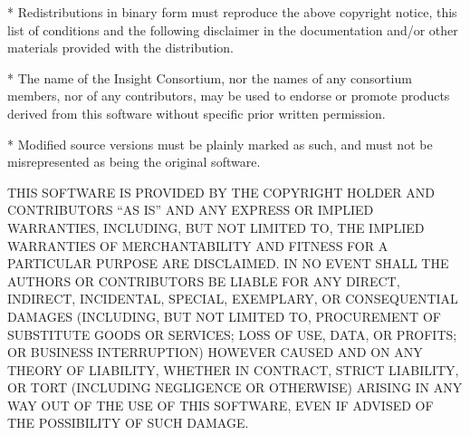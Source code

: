 \documentclass{InsightHowto}
\begin{document}
 * Redistributions in binary form must reproduce the above copyright notice,
   this list of conditions and the following disclaimer in the documentation
   and/or other materials provided with the distribution.

 * The name of the Insight Consortium, nor the names of any consortium members,
   nor of any contributors, may be used to endorse or promote products derived
   from this software without specific prior written permission.

  * Modified source versions must be plainly marked as such, and must not be
    misrepresented as being the original software.

THIS SOFTWARE IS PROVIDED BY THE COPYRIGHT HOLDER AND CONTRIBUTORS ``AS IS'' AND ANY EXPRESS
OR IMPLIED WARRANTIES, INCLUDING, BUT NOT LIMITED TO, THE IMPLIED WARRANTIES OF
MERCHANTABILITY AND FITNESS FOR A PARTICULAR PURPOSE ARE DISCLAIMED. IN NO EVENT SHALL THE
AUTHORS OR CONTRIBUTORS BE LIABLE FOR ANY DIRECT, INDIRECT, INCIDENTAL, SPECIAL, EXEMPLARY,
OR CONSEQUENTIAL DAMAGES (INCLUDING, BUT NOT LIMITED TO, PROCUREMENT OF SUBSTITUTE GOODS OR
SERVICES; LOSS OF USE, DATA, OR PROFITS; OR BUSINESS INTERRUPTION) HOWEVER CAUSED AND ON ANY
THEORY OF LIABILITY, WHETHER IN CONTRACT, STRICT LIABILITY, OR TORT (INCLUDING NEGLIGENCE OR
OTHERWISE) ARISING IN ANY WAY OUT OF THE USE OF THIS SOFTWARE, EVEN IF ADVISED OF THE
POSSIBILITY OF SUCH DAMAGE.
\end{document}
